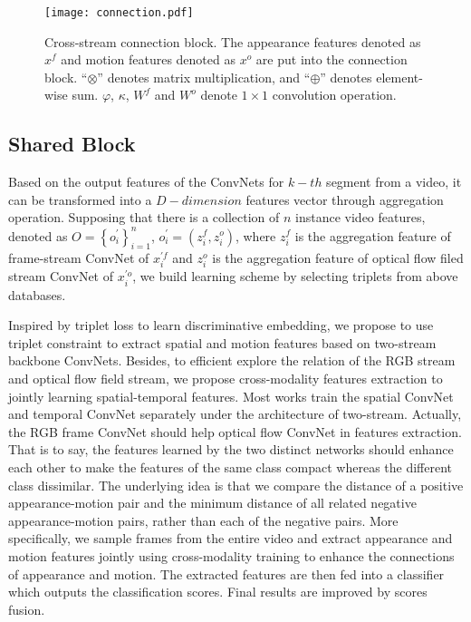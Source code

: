 \documentclass[conference,compsoc]{IEEEtran}
\begin{document}
\begin{figure}[h]
    \centering
    \texttt{[image: connection.pdf]}
    \caption{Cross-stream connection block. The appearance features denoted as $x^{f} $ and motion features denoted as $x^{o}$ are put into the connection block. ``$\otimes$'' denotes matrix multiplication, and ``$\oplus$'' denotes element-wise sum. $\varphi$, $\kappa$, $W^{f}$ and $W^{o}$ denote $1 \times 1$ convolution operation.}
    \label{fig:connectin}
\end{figure}

\subsection{Shared Block}

Based on the output features of the ConvNets for $k-th$ segment from a video, it can be transformed into a $D-dimension$ features vector through aggregation operation. Supposing that there is a collection of $n$ instance video features, denoted as $O = \left\{ o _ { i } ^{\prime} \right\} _ { i = 1 } ^ { n }$, $o _ { i } ^{\prime} = \left( z _ { i } ^ { f } , z _ { i } ^ { o } \right)$, where $z _ { i } ^ { f }$ is the aggregation feature of frame-stream ConvNet of $x_{i}^{\prime f}$ and $z_{i}^{ o}$ is the aggregation feature of optical flow filed stream ConvNet of $x_{i}^{\prime o}$, we build learning scheme by selecting triplets from above databases.

Inspired by triplet loss to learn discriminative embedding, we propose to use triplet constraint to extract spatial and motion features based on two-stream backbone ConvNets. Besides, to efficient explore the relation of the RGB stream and optical flow field stream, we propose cross-modality features extraction to jointly learning spatial-temporal features. Most works train the spatial ConvNet and temporal ConvNet separately under the architecture of two-stream. Actually, the RGB frame ConvNet should help optical flow ConvNet in features extraction. That is to say, the features learned by the two distinct networks should enhance each other to make the features of the same class compact whereas the different class dissimilar. The underlying idea is that we compare the distance of a positive appearance-motion pair and the minimum distance of all related negative appearance-motion pairs, rather than each of the negative pairs. More specifically, we sample frames from the entire video and extract appearance and motion features jointly using cross-modality training to enhance the connections of appearance and motion. The extracted features are then fed into a classifier which outputs the classification scores. Final results are improved by scores fusion.
\end{document}
